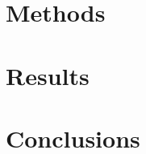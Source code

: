 \documentclass[]{article}
\begin{document}
\section*{Methods}

\section*{Results}

\section*{Conclusions}
\end{document}
